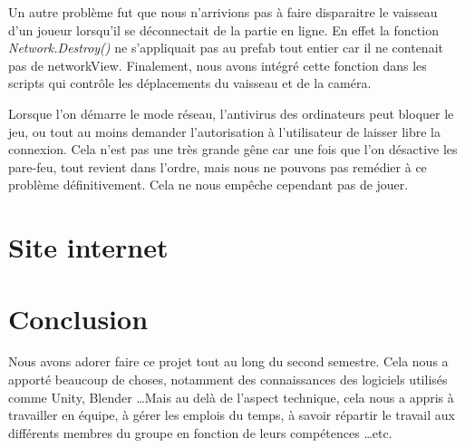 \documentclass[12pt, titlepage]{article}
\begin{document}
\begin{spacing}{1.5}
Un autre problème fut que nous n'arrivions pas à faire disparaitre le vaisseau d'un joueur lorsqu'il se déconnectait de la partie en ligne. En effet la fonction \textit{Network.Destroy()} ne s'appliquait pas au prefab tout entier car il ne contenait pas de networkView. Finalement, nous avons intégré cette fonction dans les scripts qui contrôle les déplacements du vaisseau et de la caméra.

Lorsque l'on démarre le mode réseau, l'antivirus des ordinateurs peut bloquer le jeu, ou tout au moins demander l'autorisation à l'utilisateur de laisser libre la connexion. Cela n'est pas une très grande gêne car une fois que l'on désactive les pare-feu, tout revient dans l'ordre, mais nous ne pouvons pas remédier à ce problème définitivement. Cela ne nous empêche cependant pas de jouer.

\newpage
\section{Site internet}

\newpage
\section*{Conclusion}

Nous avons adorer faire ce projet tout au long du second semestre. Cela nous a apporté beaucoup de choses, notamment des connaissances des logiciels utilisés comme Unity, Blender \dots Mais au delà de l'aspect technique, cela nous a appris à travailler en équipe, à gérer les emplois du temps, à savoir répartir le travail aux différents membres du groupe en fonction de leurs compétences \dots etc.

\end{spacing}
\end{document}
